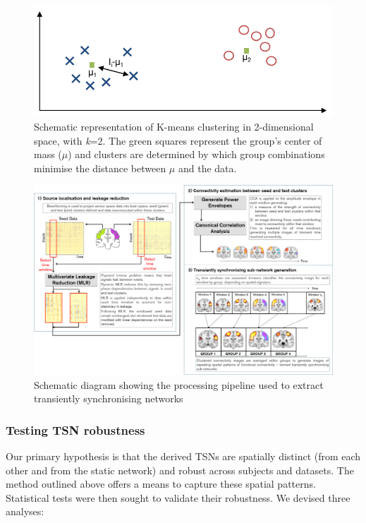 	\begin{figure}[b!]
		\begin{center}
			\includegraphics[width=0.9\linewidth]{./images/chapter5/kmeans.pdf}
			\caption{Schematic representation of K-means clustering in 2-dimensional space, with \textit{k}=2. The green squares represent the group's center of mass ($\mu$) and clusters are determined by which group combinations minimise the distance between $\mu$ and the data. \label{figure_5_00}}
		\end{center}
	\end{figure}



\begin{landscape}
	\begin{figure}
		\begin{center}
			\includegraphics[width=0.9\linewidth]{./images/chapter5/Figure_1.png}
			\caption{Schematic diagram showing the processing pipeline used to extract transiently synchronising networks \label{figure_5_1}}
		\end{center}
	\end{figure}
\end{landscape}

\subsubsection{Testing TSN robustness}
Our primary hypothesis is that the derived TSNs are spatially distinct (from each other and from the static network) and robust across subjects and datasets. The method outlined above offers a means to capture these spatial patterns. Statistical tests were then sought to validate their robustness. We devised three analyses:

